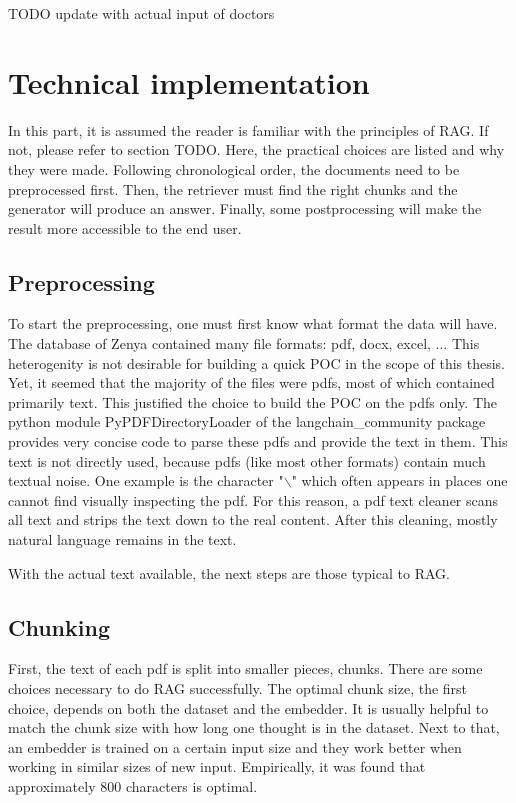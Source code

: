 TODO update with actual input of doctors


\section{Technical implementation}
In this part, it is assumed the reader is familiar with the principles of RAG. If not, please refer to section TODO. Here, the practical choices are listed and why they were made. Following chronological order, the documents need to be preprocessed first. Then, the retriever must find the right chunks and the generator will produce an answer. Finally, some postprocessing will make the result more accessible to the end user.

\subsection{Preprocessing}
To start the preprocessing, one must first know what format the data will have. The database of Zenya contained many file formats: pdf, docx, excel, ... This heterogenity is not desirable for building a quick POC in the scope of this thesis. Yet, it seemed that the majority of the files were pdfs, most of which contained primarily text. This justified the choice to build the POC on the pdfs only. The python module PyPDFDirectoryLoader of the langchain\_community package  provides very concise code to parse these pdfs and provide the text in them. This text is not directly used, because pdfs (like most other formats) contain much textual noise. One example is the character "$\backslash$" which often appears in places one cannot find visually inspecting the pdf. For this reason, a pdf text cleaner scans all text and strips the text down to the real content. After this cleaning, mostly natural language remains in the text.

With the actual text available, the next steps are those typical to RAG. 

\subsection{Chunking}
First, the text of each pdf is split into smaller pieces, chunks. There are some choices necessary to do RAG successfully. The optimal chunk size, the first choice, depends on both the dataset and the embedder. It is usually helpful to match the chunk size with how long one thought is in the dataset. Next to that, an embedder is trained on a certain input size and they work better when working in similar sizes of new input. Empirically, it was found that approximately 800 characters is optimal. 

